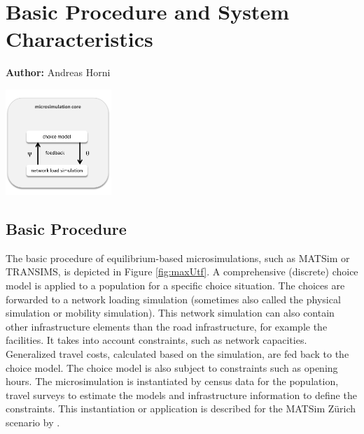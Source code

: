 \chapter{Basic Procedure and System Characteristics}
\label{ch:basicprocedure}
\hfill \textbf{Author:} Andreas Horni 

\begin{center} \includegraphics[width=0.3\textwidth, angle=0]{understanding/figures/fixedpoint.pdf} \end{center}



\section{Basic Procedure}
The basic procedure of equilibrium-based microsimulations, such as MATSim or TRANSIMS, is depicted in Figure \ref{fig:maxUtf}. A comprehensive (discrete) choice model is applied to a population for a specific choice situation. The choices are forwarded to a network loading simulation (sometimes also called the physical simulation or mobility simulation). This network simulation can also contain other infrastructure elements than the road infrastructure, for example the facilities. It takes into account constraints, such as network capacities. Generalized travel costs, calculated based on the simulation, are fed back to the choice model. The choice model is also subject to constraints such as opening hours. The microsimulation is instantiated by census data for the population, travel surveys to estimate the models and infrastructure information to define the constraints. This instantiation or application is described for the MATSim Zürich scenario by  \citet[][]{HorniEtAl_TechRep_IVT_2011_a}. %

